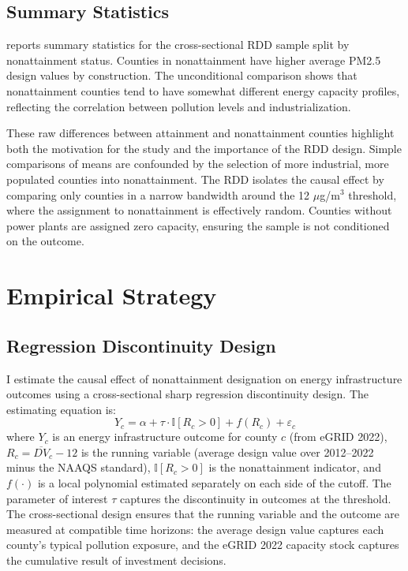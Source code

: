 \documentclass[12pt]{article}
\newcommand{\ind}{\mathbb{I}}
\begin{document}
\subsection{Summary Statistics}

 reports summary statistics for the cross-sectional RDD sample split by nonattainment status. Counties in nonattainment have higher average PM2.5 design values by construction. The unconditional comparison shows that nonattainment counties tend to have somewhat different energy capacity profiles, reflecting the correlation between pollution levels and industrialization.

These raw differences between attainment and nonattainment counties highlight both the motivation for the study and the importance of the RDD design. Simple comparisons of means are confounded by the selection of more industrial, more populated counties into nonattainment. The RDD isolates the causal effect by comparing only counties in a narrow bandwidth around the 12 $\mu$g/m$^3$ threshold, where the assignment to nonattainment is effectively random. Counties without power plants are assigned zero capacity, ensuring the sample is not conditioned on the outcome.




\section{Empirical Strategy}
\label{sec:strategy}

\subsection{Regression Discontinuity Design}

I estimate the causal effect of nonattainment designation on energy infrastructure outcomes using a cross-sectional sharp regression discontinuity design. The estimating equation is:
\begin{equation}
Y_c = \alpha + \tau \cdot \ind[R_c > 0] + f(R_c) + \varepsilon_c
\label{eq:rdd}
\end{equation}
where $Y_c$ is an energy infrastructure outcome for county $c$ (from eGRID 2022), $R_c = \overline{DV}_c - 12$ is the running variable (average design value over 2012--2022 minus the NAAQS standard), $\ind[R_c > 0]$ is the nonattainment indicator, and $f(\cdot)$ is a local polynomial estimated separately on each side of the cutoff. The parameter of interest $\tau$ captures the discontinuity in outcomes at the threshold. The cross-sectional design ensures that the running variable and the outcome are measured at compatible time horizons: the average design value captures each county's typical pollution exposure, and the eGRID 2022 capacity stock captures the cumulative result of investment decisions.
\end{document}
